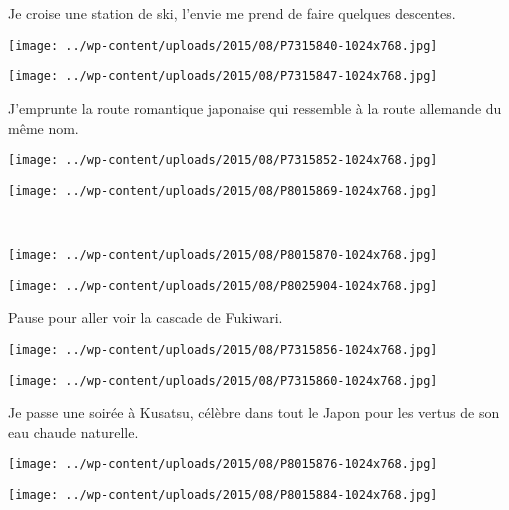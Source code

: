  Je croise une station de ski, l'envie me prend de faire quelques descentes. 
\begin{center} \texttt{[image: ../wp-content/uploads/2015/08/P7315840-1024x768.jpg]} \end{center}
\begin{center} \texttt{[image: ../wp-content/uploads/2015/08/P7315847-1024x768.jpg]} \end{center}
\vspace{-\topsep}
\vspace{-2.75mm}
\pagebreak

 J'emprunte la route romantique japonaise qui ressemble à la route allemande du même nom. 
\begin{center} \texttt{[image: ../wp-content/uploads/2015/08/P7315852-1024x768.jpg]} \end{center}
\begin{center} \texttt{[image: ../wp-content/uploads/2015/08/P8015869-1024x768.jpg]} \end{center}
\vspace{-\topsep}
\vspace{-2.75mm}
\pagebreak
~
\begin{center} \texttt{[image: ../wp-content/uploads/2015/08/P8015870-1024x768.jpg]} \end{center}
\begin{center} \texttt{[image: ../wp-content/uploads/2015/08/P8025904-1024x768.jpg]} \end{center}
\vspace{-\topsep}
\vspace{-3.25mm}
\pagebreak

 Pause pour aller voir la cascade de Fukiwari.
\begin{center} \texttt{[image: ../wp-content/uploads/2015/08/P7315856-1024x768.jpg]} \end{center}
\begin{center} \texttt{[image: ../wp-content/uploads/2015/08/P7315860-1024x768.jpg]} \end{center}
\vspace{-\topsep}
\vspace{-3.25mm}
\pagebreak

 Je passe une soirée à Kusatsu, célèbre dans tout le Japon pour les vertus de son eau chaude naturelle. 
\begin{center} \texttt{[image: ../wp-content/uploads/2015/08/P8015876-1024x768.jpg]} \end{center}
\begin{center} \texttt{[image: ../wp-content/uploads/2015/08/P8015884-1024x768.jpg]} \end{center}
\vspace{-\topsep}
\vspace{-2.75mm}
\pagebreak

